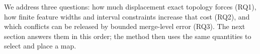 We address three questions: how much displacement exact topology forces (RQ1), how finite feature widths and interval constraints increase that cost (RQ2), and which conflicts can be released by bounded merge-level error (RQ3). The next section answers them in this order; the method then uses the same quantities to select and place a map.
